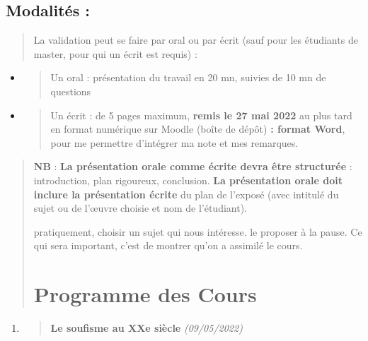 \hypertarget{modalituxe9s}{%
\subsection{Modalités :}\label{modalituxe9s}}

\begin{quote}
La validation peut se faire par oral ou par écrit (sauf pour les
étudiants de master, pour qui un écrit est requis) :
\end{quote}

\begin{itemize}
\item
  \begin{quote}
  Un oral : présentation du travail en 20 mn, suivies de 10 mn de
  questions
  \end{quote}
\item
  \begin{quote}
  Un écrit : de 5 pages maximum, \textbf{remis le 27 mai 2022} au plus
  tard en format numérique sur Moodle (boîte de dépôt) \textbf{: format
  Word}, pour me permettre d'intégrer ma note et mes remarques.
  \end{quote}
\end{itemize}

\begin{quote}
\textbf{NB} : \textbf{La présentation orale comme écrite devra être
structurée} : introduction, plan rigoureux, conclusion. \textbf{La
présentation orale doit inclure la présentation écrite} du plan de
l'exposé (avec intitulé du sujet ou de l'œuvre choisie et nom de
l'étudiant).



pratiquement, choisir un sujet qui nous intéresse. le proposer à la pause.
Ce qui sera important, c'est de montrer qu'on a assimilé le cours.


\section{Programme des Cours}
\end{quote}

 
\begin{enumerate}
\def\labelenumi{\arabic{enumi}.}
\setcounter{enumi}{2}
\item
  \begin{quote}
  \textbf{{Le soufisme au XXe siècle}} \emph{(09/05/2022)}
  \end{quote}
\end{enumerate}

